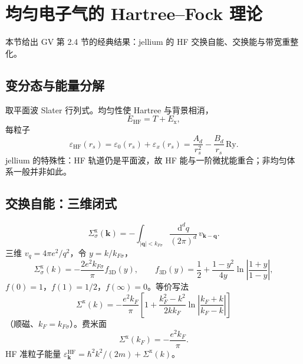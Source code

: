 \section{均匀电子气的 Hartree--Fock 理论}

本节给出 GV 第 2.4 节的经典结果：jellium 的 HF 交换自能、交换能与带宽重整化。

\subsection{变分态与能量分解}

取平面波 Slater 行列式。均匀性使 Hartree 与背景相消，
\begin{equation}
  E_{\mathrm{HF}}=T+E_{\mathrm{x}},
\end{equation}
每粒子
\begin{equation}
  \varepsilon_{\mathrm{HF}}(r_s)
  =\varepsilon_0(r_s)+\varepsilon_x(r_s)
  =\frac{A_d}{r_s^2}-\frac{B_d}{r_s}\,\mathrm{Ry}.
\end{equation}
jellium 的特殊性：HF 轨道仍是平面波，故 HF 能与一阶微扰能重合；非均匀体系一般并非如此。

\subsection{交换自能：三维闭式}

\begin{equation}
  \Sigma^{\mathrm{x}}_\sigma(\mathbf{k})
  =-\int_{|\mathbf{q}|<k_{F\sigma}}
  \frac{\mathrm{d}^d q}{(2\pi)^d}\,
  v_{\mathbf{k}-\mathbf{q}}.
\label{eq:Sigmax}
\end{equation}
三维 $v_q=4\pi e^2/q^2$，令 $y=k/k_{F\sigma}$，
\begin{equation}
  \Sigma^{\mathrm{x}}_\sigma(k)
  =-\frac{2e^2 k_{F\sigma}}{\pi}
  f_{3\mathrm{D}}(y),
  \qquad
  f_{3\mathrm{D}}(y)
  =\frac12+\frac{1-y^2}{4y}
  \ln\left|\frac{1+y}{1-y}\right|,
\label{eq:Sigmax_closed}
\end{equation}
$f(0)=1$，$f(1)=1/2$，$f(\infty)=0$。等价写法
\begin{equation}
  \Sigma^{\mathrm{x}}(k)
  =-\frac{e^2 k_F}{\pi}
  \left[
  1+\frac{k_F^2-k^2}{2kk_F}
  \ln\left|\frac{k_F+k}{k_F-k}\right|
  \right]
\end{equation}
（顺磁、$k_F=k_{F\sigma}$）。费米面
\begin{equation}
  \Sigma^{\mathrm{x}}(k_F)=-\frac{e^2 k_F}{\pi}.
\end{equation}
HF 准粒子能量 $\varepsilon_{\mathbf{k}}^{\mathrm{HF}}=\hbar^2k^2/(2m)+\Sigma^{\mathrm{x}}(k)$。


